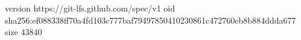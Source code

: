 version https://git-lfs.github.com/spec/v1
oid sha256:ef088338ff70a4fd103c777baf79497850410230861c472760eb8b884ddda677
size 43840
